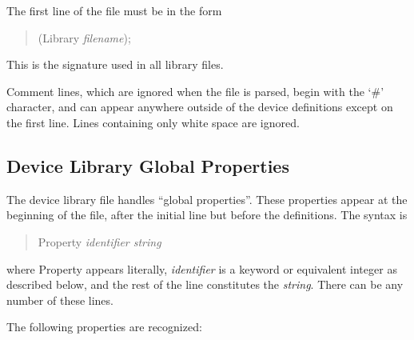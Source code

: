 The first line of the file must be in the form
\begin{quote}\vt
(Library {\it filename});
\end{quote}
This is the signature used in all library files.

Comment lines, which are ignored when the file is parsed, begin with
the `{\vt \#}' character, and can appear anywhere outside of the
device definitions except on the first line.  Lines containing only
white space are ignored.

\subsection{Device Library Global Properties}
\label{devglobprop}

The device library file handles ``global properties''.  These
properties appear at the beginning of the file, after the initial line
but before the definitions.  The syntax is
\begin{quote}\vt
Property {\it identifier string}
\end{quote}
where {\vt Property} appears literally, {\it identifier} is a keyword
or equivalent integer as described below, and the rest of the line
constitutes the {\it string}.  There can be any number of these lines.

The following properties are recognized:

